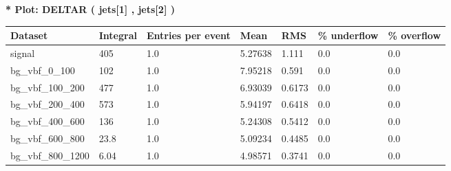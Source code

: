 \documentclass[a4paper, 10pt]{article}
\begin{document}
\textbf{* Plot: DELTAR ( jets[1] , jets[2] ) }\\
   \begin{table}[H]
  \begin{center}
    \begin{tabular}{|m{23.0mm}|m{23.0mm}|m{18.0mm}|m{19.0mm}|m{19.0mm}|m{19.0mm}|m{19.0mm}|}
      \hline
      {\cellcolor{yellow}         Dataset}& {\cellcolor{yellow}         Integral}& {\cellcolor{yellow}         Entries per event}& {\cellcolor{yellow}         Mean}& {\cellcolor{yellow}         RMS}& {\cellcolor{yellow}         \% underflow}& {\cellcolor{yellow}         \% overflow}\\
      \hline
      {\cellcolor{white}         signal}& {\cellcolor{white}         405}& {\cellcolor{white}         1.0}& {\cellcolor{white}         5.27638}& {\cellcolor{white}         1.111}& {\cellcolor{green}         0.0}& {\cellcolor{green}         0.0}\\
      \hline
      {\cellcolor{white}         bg\_vbf\_0\_100}& {\cellcolor{white}         102}& {\cellcolor{white}         1.0}& {\cellcolor{white}         7.95218}& {\cellcolor{white}         0.591}& {\cellcolor{green}         0.0}& {\cellcolor{green}         0.0}\\
      \hline
      {\cellcolor{white}         bg\_vbf\_100\_200}& {\cellcolor{white}         477}& {\cellcolor{white}         1.0}& {\cellcolor{white}         6.93039}& {\cellcolor{white}         0.6173}& {\cellcolor{green}         0.0}& {\cellcolor{green}         0.0}\\
      \hline
      {\cellcolor{white}         bg\_vbf\_200\_400}& {\cellcolor{white}         573}& {\cellcolor{white}         1.0}& {\cellcolor{white}         5.94197}& {\cellcolor{white}         0.6418}& {\cellcolor{green}         0.0}& {\cellcolor{green}         0.0}\\
      \hline
      {\cellcolor{white}         bg\_vbf\_400\_600}& {\cellcolor{white}         136}& {\cellcolor{white}         1.0}& {\cellcolor{white}         5.24308}& {\cellcolor{white}         0.5412}& {\cellcolor{green}         0.0}& {\cellcolor{green}         0.0}\\
      \hline
      {\cellcolor{white}         bg\_vbf\_600\_800}& {\cellcolor{white}         23.8}& {\cellcolor{white}         1.0}& {\cellcolor{white}         5.09234}& {\cellcolor{white}         0.4485}& {\cellcolor{green}         0.0}& {\cellcolor{green}         0.0}\\
      \hline
      {\cellcolor{white}         bg\_vbf\_800\_1200}& {\cellcolor{white}         6.04}& {\cellcolor{white}         1.0}& {\cellcolor{white}         4.98571}& {\cellcolor{white}         0.3741}& {\cellcolor{green}         0.0}& {\cellcolor{green}         0.0}\\

\end{tabular}
\end{center}
\end{table}
\end{document}
